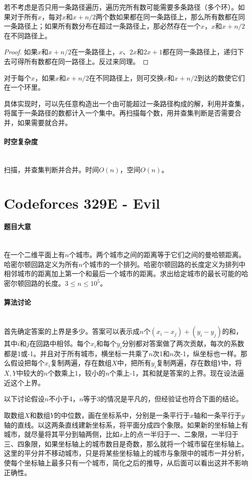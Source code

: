 \documentclass[UTF8]{ctexart}
\newcommand{\myparagraph}[1]{\paragraph{#1}\mbox{}\\}
\theoremstyle{nonumberplain}
\newtheorem{proof}{\hspace{1em}证明：}
\begin{document}
			若不考虑是否只用一条路径遍历，遍历完所有数可能需要多条路径（多个环）。如果对于所有$x$，每对$x$和$x+n/2$两个数如果都在同一条路径上，那么所有数都在同一条路径上；如果所有数分布在超过一条路径上，那必然存在一个$x$，$x$和$x+n/2$在不同路径上。
			
			\begin{proof} 如果$x$和$x+n/2$在一条路径上，$x$、$2x$和$2x+1$都在同一条路径上，递归下去可得所有数都在同一路径上。反过来同理。 \end{proof}
			
			对于每个$x$，如果$x$和$x+n/2$在不同路径上，则可交换$x$和$x+n/2$到达的数使它们在一个环里。
			
			具体实现时，可以先任意构造出一个由可能超过一条路径构成的解，利用并查集，将属于一条路径的数都计入一个集中。再扫描每个数，用并查集判断是否需要合并，如果需要就合并。
		
		\myparagraph{时空复杂度}
		
			扫描，并查集判断并合并。时间$O(n)$，空间$O(n)$。
	
	\section{Codeforces 329E - Evil}
	
		\myparagraph{题目大意}
		
			在一个二维平面上有$n$个城市。两个城市之间的距离等于它们之间的曼哈顿距离。哈密尔顿回路定义为所有$n$个城市的一个排列。哈密尔顿回路的长度定义为排列中相邻城市的距离加上第一个和最后一个城市的距离。求出给定城市的最长可能的哈密尔顿回路的长度。$3 \leq n \leq 10^5$。
			
		\myparagraph{算法讨论}
		
			首先确定答案的上界是多少。答案可以表示成$n$个$(x_i-x_j)+(y_i-y_j)$的和，其中$i$和$j$在回路中相邻。每个$x_i$和每个$y_i$分别都对答案做了两次贡献，每次的系数都是1或-1。并且对于所有城市，横坐标一共乘了$n$次1和$n$次-1，纵坐标也一样。那么假设把每个$x_i$复制两遍，存在数组$X$中，把所有$y_i$复制两遍，存在数组$Y$中，将$X,Y$中较大的$n$个数乘上1，较小的$n$个乘上-1，其和就是答案的上界。现在设法逼近这个上界。
			
			以下讨论假设$n$不小于4，$n$等于3的情况是平凡的，但经验证也符合下面的结论。
			
			取数组$X$和数组$Y$的中位数，画在坐标系中，分别是一条平行于$x$轴和一条平行于$y$轴的直线。以这两条直线建新坐标系，将平面分成四个象限。如果新的坐标轴上有城市，就尽量将其平分到轴两侧，比如$x$上的点一半归于一、二象限，一半归于三、四象限，如果坐标轴上的城市数目是奇数，那么就将一个城市留在坐标轴上。这里的平分并不移动城市，只是将某些坐标轴上的城市与象限中的城市一并分析，使每个坐标轴上最多只有一个城市，简化之后的推导，从后面可以看出这并不影响正确性。
			
\end{document}
